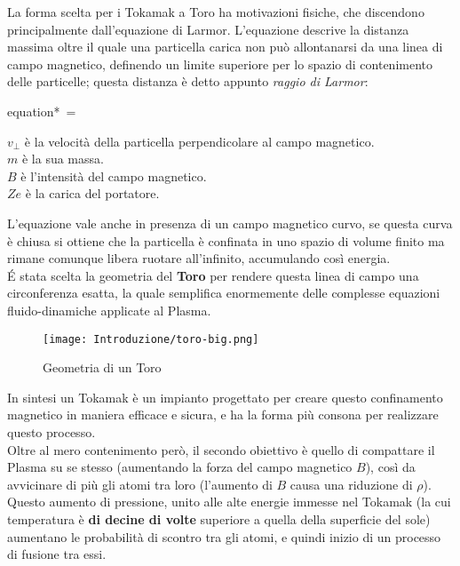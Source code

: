 \noindent
La forma scelta per i Tokamak a Toro ha motivazioni fisiche, che discendono principalmente dall'equazione di Larmor. L'equazione descrive la distanza massima oltre il quale una particella carica non può allontanarsi da una linea di campo magnetico, definendo un limite superiore per lo spazio di contenimento delle particelle; questa distanza è detto appunto \textit{raggio di Larmor}:\\
\begin{vwcol}[widths={0.3,0.7}, sep=8mm, rule=1px]
	\begin{empheq}[box=\mathCalc]{equation*} \label{eq:Larmor}
		{\displaystyle \,\rho ={}}
	\end{empheq}
	\newpage %
	\begin{spacing}{1.25}
		{\footnotesize
			$ {\displaystyle v_{\perp }} $ è la velocità della particella perpendicolare al campo magnetico.\\
			$ {\displaystyle m} $ è la sua massa.\\
			$ {\displaystyle B} $ è l'intensità del campo magnetico.\\
			$ {\displaystyle Ze} $ è la carica del portatore.
		}
	\end{spacing}
\end{vwcol}
\noindent
L'equazione vale anche in presenza di un campo magnetico curvo, se questa curva è chiusa si ottiene che la particella è confinata in uno spazio di volume finito ma rimane comunque libera ruotare all'infinito, accumulando così energia.\\
\'E stata scelta la geometria del \textbf{Toro} per rendere questa linea di campo una circonferenza esatta, la quale semplifica enormemente delle complesse equazioni fluido-dinamiche applicate al Plasma.\vspace{-5mm}
\begin{figure}[H]
	\centering
	\caption[Geometria di un Toro]{Geometria di un Toro}
	\texttt{[image: Introduzione/toro-big.png]}
\end{figure}\vspace{-8mm}
\noindent
In sintesi un Tokamak è un impianto progettato per creare questo confinamento magnetico in maniera efficace e sicura, e ha la forma più consona per realizzare questo processo.\\
Oltre al mero contenimento però, il secondo obiettivo è quello di compattare il Plasma su se stesso (aumentando la forza del campo magnetico $ B $), così da avvicinare di più gli atomi tra loro (l'aumento di $ B $ causa una riduzione di $ \rho $).\\
Questo aumento di pressione, unito alle alte energie immesse nel Tokamak (la cui temperatura è \textbf{di decine di volte} superiore a quella della superficie del sole) aumentano le probabilità di scontro tra gli atomi, e quindi inizio di un processo di fusione tra essi. 

